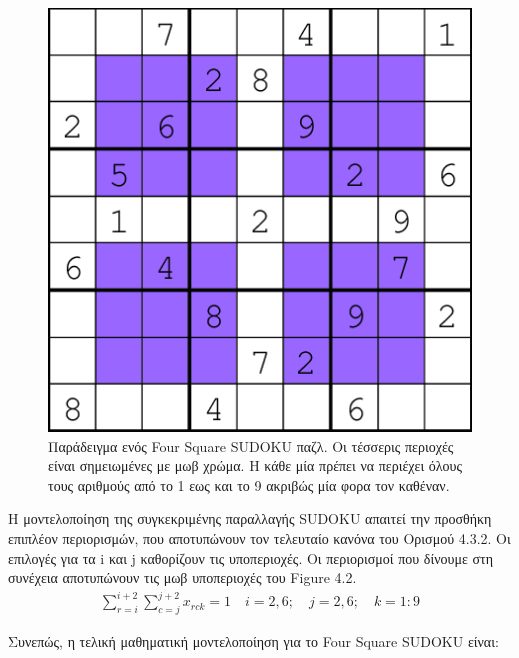 \documentclass[12pt]{book}
\theoremstyle{definition}
\begin{document}
\begin{figure}[h]
	\centering	
	\includegraphics[scale=0.7]{Figures/An-example-Four-Square-Sudoku-puzzle.png}
	\caption{Παράδειγμα ενός Four Square SUDOKU παζλ. Οι τέσσερις περιοχές είναι σημειωμένες με μωβ χρώμα. Η κάθε μία πρέπει να περιέχει όλους τους αριθμούς από το 1 εως και το 9 ακριβώς μία φορα τον καθέναν.}
\end{figure}

Η μοντελοποίηση της συγκεκριμένης παραλλαγής SUDOKU απαιτεί την προσθήκη επιπλέον περιορισμών, που αποτυπώνουν τον τελευταίο κανόνα του Ορισμού 4.3.2. Οι επιλογές για τα i και j καθορίζουν τις υποπεριοχές. Οι περιορισμοί που δίνουμε στη συνέχεια αποτυπώνουν τις μωβ υποπεριοχές του Figure 4.2.\\

\begin{align*}
	\sum_{r=i}^{i+2}{\sum_{c=j}^{j+2}x_{rck}} = 1 \quad i=2,6; \quad j=2,6; \quad k=1:9
\end{align*}

Συνεπώς, η τελική μαθηματική μοντελοποίηση για το Four Square SUDOKU είναι:
\end{document}
